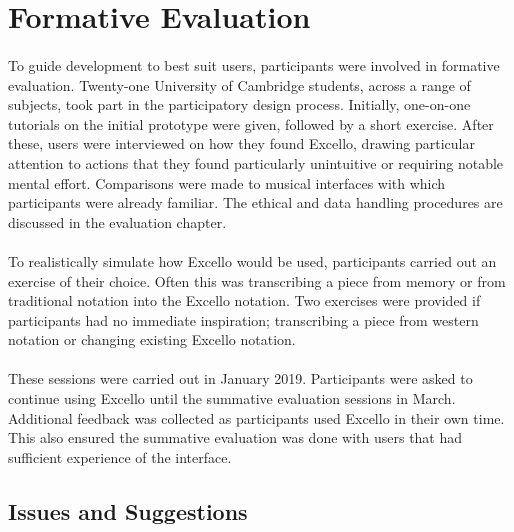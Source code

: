 \section{Formative Evaluation}

\paragraph{} To guide development to best suit users, participants were involved in formative evaluation. Twenty-one University of Cambridge students, across a range of subjects, took part in the participatory design process. Initially, one-on-one tutorials on the initial prototype were given, followed by a short exercise. After these, users were interviewed on how they found Excello, drawing particular attention to actions that they found particularly unintuitive or requiring notable mental effort. Comparisons were made to musical interfaces with which participants were already familiar. The ethical and data handling procedures are discussed in the evaluation chapter.

\paragraph{} To realistically simulate how Excello would be used, participants carried out an exercise of their choice. Often this was transcribing a piece from memory or from traditional notation into the Excello notation. Two exercises were provided if participants had no immediate inspiration; transcribing a piece from western notation or changing existing Excello notation.

\paragraph{} These sessions were carried out in January 2019. Participants were asked to continue using Excello until the summative evaluation sessions in March. Additional feedback was collected as participants used Excello in their own time. This also ensured the summative evaluation was done with users that had sufficient experience of the interface.

\subsection{Issues and Suggestions}

